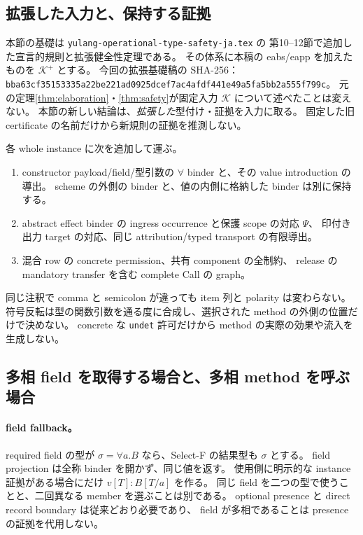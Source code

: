 \documentclass[11pt,a4paper]{article}
\newcommand{\Core}{\mathcal K}
\begin{document}
\subsection{拡張した入力と、保持する証拠}

本節の基礎は \nolinkurl{yulang-operational-type-safety-ja.tex} の
第10--12節で追加した宣言的規則と拡張健全性定理である。
その体系に本稿の eabs/eapp を加えたものを \(\Core^+\) とする。
今回の拡張基礎稿の SHA-256：\nolinkurl{bba63cf35153335a22be221ad0925dcef7ac4afdf441e49a5fa5bb2a555f799c}。
元の定理\ref{thm:elaboration}・\ref{thm:safety}が固定入力 \(\Core\) について述べたことは変えない。
本節の新しい結論は、\emph{拡張した}型付け・証拠を入力に取る。
固定した旧 certificate の名前だけから新規則の証拠を推測しない。

各 whole instance に次を追加して運ぶ。
\begin{enumerate}
\item constructor payload/field/型引数の \(\forall\) binder と、その value introduction の導出。
scheme の外側の binder と、値の内側に格納した binder は別に保持する。
\item abstract effect binder の ingress occurrence と保護 scope の対応 \(\Psi\)、
印付き出力 target の対応、同じ attribution/typed transport の有限導出。
\item 混合 row の concrete permission、共有 component の全制約、
release の mandatory transfer を含む complete Call の graph。
\end{enumerate}
同じ注釈で comma と semicolon が違っても item 列と polarity は変わらない。
符号反転は型の関数引数を通る度に合成し、選択された method の外側の位置だけで決めない。
concrete な \texttt{undet} 許可だけから method の実際の効果や流入を生成しない。

\subsection{多相 field を取得する場合と、多相 method を呼ぶ場合}

\paragraph{field fallback。}
required field の型が \(\sigma=\forall a.B\) なら、Select-F の結果型も \(\sigma\) とする。
field projection は全称 binder を開かず、同じ値を返す。
使用側に明示的な instance 証拠がある場合にだけ \(v[T]:B[T/a]\) を作る。
同じ field を二つの型で使うことと、二回異なる member を選ぶことは別である。
optional presence と direct record boundary は従来どおり必要であり、
field が多相であることは presence の証拠を代用しない。
\end{document}
